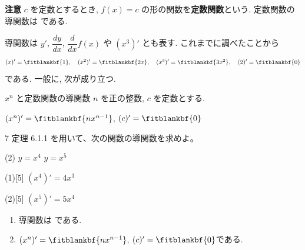 \documentclass[14pt,dvipdfmx]{jsarticle}
\begin{document}
\vfill
\nextpage

\vspace{-1.4zw}%
\vspace{0.15em}
\textbf{注意}\quad
$c$ を定数とするとき, $f(x)=c$ の形の関数を\textbf{定数関数}という.
定数関数の導関数は  である.
\vspace{1em}

導関数は $y'$, $\dfrac{dy}{dx}$, $\dfrac{d}{dx}f(x)$ や $(x^{3})'$ とも表す.
これまでに調べたことから
\[
  (x)'=\fitblankbf{1},\quad (x^{2})'=\fitblankbf{2x}, \quad (x^{3})'=\fitblankbf{3x^{2}}, \quad (2)'=\fitblankbf{0}
\]
である.
一般に, 次が成り立つ.

\vspace{-0.1em}
\begin{theorembox}{$x^{n}$ と定数関数の導関数}
  $n$ を正の整数, $c$ を定数とする.
  \par\vspace{0.15em}
  $(x^{n})'=\fitblankbf{nx^{n-1}}$,\qquad
  $(c)'=\fitblankbf{0}$
\end{theorembox}

\vspace{-0.2em}
\begin{practiceprob}{7}
  定理 6.1.1 を用いて、次の関数の導関数を求めよ。
  \begin{tasks}[label=(\arabic*), label-width=1.6zw, item-indent=2zw, after-item-skip=0.05em](2)
    \task $y=x^{4}$
    \task $y=x^{5}$
  \end{tasks}
\end{practiceprob}
\vspace{-0.45em}
\begin{answerbox}{(1)}[5]
  $(x^{4})'=4x^{3}$
\end{answerbox}
\begin{answerbox}{(2)}[5]
  $(x^{5})'=5x^{4}$
\end{answerbox}

\vfill
\begin{summarybox}
  \begin{enumerate}[label=\textbf{\arabic*}, leftmargin=1.5zw, itemsep=0.25em]
    \item 導関数は
          {\renewcommand{\fitblankpad}{2.2zw}%
          }
          \mbox{である.}
          \par\vspace{0.5em}
    \item $(x^{n})'=\fitblankbf{nx^{n-1}}$,\quad\quad
          $(c)'=\fitblankbf{0}$\mbox{である.}
  \end{enumerate}
\end{summarybox}

\vspace{0.05em}
\end{document}
